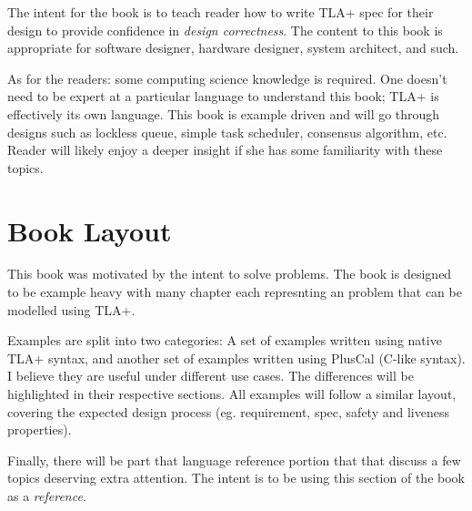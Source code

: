 The intent for the book is to teach reader how to write TLA+ spec for their
design to provide confidence in \textit{design correctness}. The content to this
book is appropriate for software designer, hardware designer, system architect,
and such.\newline 

As for the readers: some computing science knowledge is required. One doesn't
need to be expert at a particular language to understand this book; TLA+ is
effectively its own language. This book is example driven and will go through
designs such as lockless queue, simple task scheduler, consensus algorithm, etc.
Reader will likely enjoy a deeper insight if she has some familiarity with these
topics.

\section{Book Layout}

This book was motivated by the intent to solve problems. The book is designed to
be example heavy with many chapter each represnting an problem that can be
modelled using TLA+.\newline

Examples are split into two categories: A set of examples written using native
TLA+ syntax, and another set of examples written using PlusCal (C-like syntax).
I believe they are useful under different use cases. The differences will be
highlighted in their respective sections. All examples will follow a similar 
layout, covering the expected design process (eg. requirement, spec, safety and
liveness properties). \newline

Finally, there will be part that language reference portion that that discuss a
few topics deserving extra attention. The intent is to be using this section of the 
book as a \textit{reference}.

